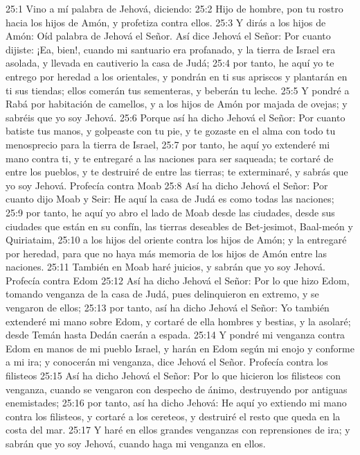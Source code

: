 25:1 Vino a mí palabra de Jehová, diciendo:   
25:2 Hijo de hombre, pon tu rostro hacia los hijos de Amón,  y profetiza contra ellos.   
25:3 Y dirás a los hijos de Amón: Oíd palabra de Jehová el Señor. Así dice Jehová el Señor: Por cuanto dijiste: ¡Ea, bien!, cuando mi santuario era profanado, y la tierra de Israel era asolada, y llevada en cautiverio la casa de Judá; 
25:4 por tanto, he aquí yo te entrego por heredad a los orientales, y pondrán en ti sus apriscos y plantarán en ti sus tiendas; ellos comerán tus sementeras, y beberán tu leche.   
25:5 Y pondré a Rabá por habitación de camellos, y a los hijos de Amón por majada de ovejas; y sabréis que yo soy Jehová.   
25:6 Porque así ha dicho Jehová el Señor: Por cuanto batiste tus manos, y golpeaste con tu pie, y te gozaste en el alma con todo tu menosprecio para la tierra de Israel,   
25:7 por tanto, he aquí yo extenderé mi mano contra ti, y te entregaré a las naciones para ser saqueada; te cortaré de entre los pueblos, y te destruiré de entre las tierras; te exterminaré, y sabrás que yo soy Jehová.   
Profecía contra Moab   
25:8 Así ha dicho Jehová el Señor: Por cuanto dijo Moab  y Seir: He aquí la casa de Judá es como todas las naciones;   
25:9 por tanto, he aquí yo abro el lado de Moab desde las ciudades, desde sus ciudades que están en su confín, las tierras deseables de Bet-jesimot, Baal-meón y Quiriataim,   
25:10 a los hijos del oriente contra los hijos de Amón; y la entregaré por heredad, para que no haya más memoria de los hijos de Amón entre las naciones.   
25:11 También en Moab haré juicios, y sabrán que yo soy Jehová.   
Profecía contra Edom   
25:12 Así ha dicho Jehová el Señor: Por lo que hizo Edom, tomando venganza de la casa de Judá, pues delinquieron en extremo, y se vengaron de ellos;   
25:13 por tanto, así ha dicho Jehová el Señor: Yo también extenderé mi mano sobre Edom, y cortaré de ella hombres y bestias, y la asolaré; desde Temán hasta Dedán caerán a espada.   
25:14 Y pondré mi venganza contra Edom en manos de mi pueblo Israel, y harán en Edom según mi enojo y conforme a mi ira; y conocerán mi venganza, dice Jehová el Señor.   
Profecía contra los filisteos   
25:15 Así ha dicho Jehová el Señor: Por lo que hicieron los filisteos con venganza, cuando se vengaron con despecho de ánimo, destruyendo por antiguas enemistades;   
25:16 por tanto, así ha dicho Jehová: He aquí yo extiendo mi mano contra los filisteos, y cortaré a los cereteos, y destruiré el resto que queda en la costa del mar.   
25:17 Y haré en ellos grandes venganzas con reprensiones de ira; y sabrán que yo soy Jehová, cuando haga mi venganza en ellos.   
